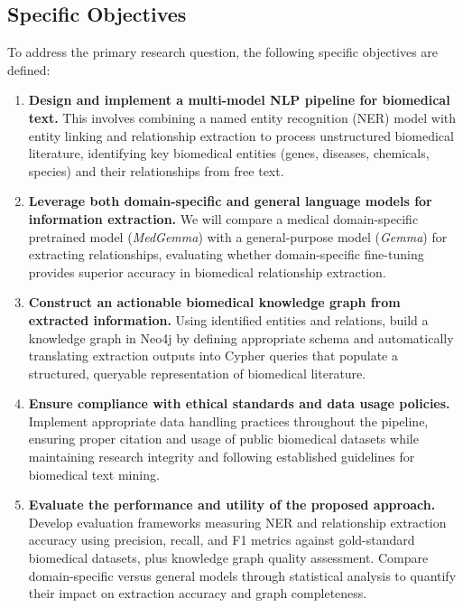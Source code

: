\subsection{Specific Objectives}

To address the primary research question, the following specific objectives are defined:

\begin{enumerate}
  \item \textbf{Design and implement a multi-model NLP pipeline for biomedical text.} This involves combining a named entity recognition (NER) model with entity linking and relationship extraction to process unstructured biomedical literature, identifying key biomedical entities (genes, diseases, chemicals, species) and their relationships from free text.

  \item \textbf{Leverage both domain-specific and general language models for information extraction.} We will compare a medical domain-specific pretrained model (\emph{MedGemma}) with a general-purpose model (\emph{Gemma}) for extracting relationships, evaluating whether domain-specific fine-tuning provides superior accuracy in biomedical relationship extraction.

  \item \textbf{Construct an actionable biomedical knowledge graph from extracted information.} Using identified entities and relations, build a knowledge graph in Neo4j by defining appropriate schema and automatically translating extraction outputs into Cypher queries that populate a structured, queryable representation of biomedical literature.

  \item \textbf{Ensure compliance with ethical standards and data usage policies.} Implement appropriate data handling practices throughout the pipeline, ensuring proper citation and usage of public biomedical datasets while maintaining research integrity and following established guidelines for biomedical text mining.

  \item \textbf{Evaluate the performance and utility of the proposed approach.} Develop evaluation frameworks measuring NER and relationship extraction accuracy using precision, recall, and F1 metrics against gold-standard biomedical datasets, plus knowledge graph quality assessment. Compare domain-specific versus general models through statistical analysis to quantify their impact on extraction accuracy and graph completeness.
\end{enumerate}

